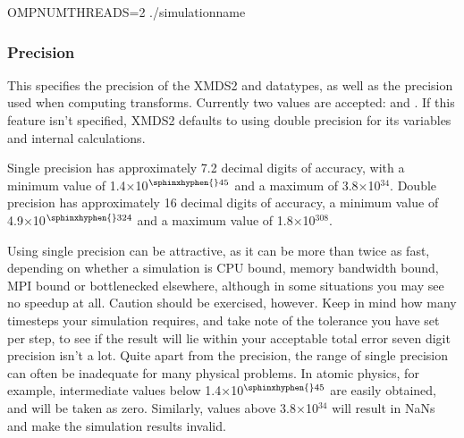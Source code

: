 \documentclass[letterpaper,10pt,english]{sphinxmanual}
\begin{document}
\begin{sphinxVerbatim}[commandchars=\\\{\}]
OMP\PYGZus{}NUM\PYGZus{}THREADS=2 ./simulation\PYGZus{}name
\end{sphinxVerbatim}

\ignorespaces 

\subsubsection{Precision}
\label{\detokenize{reference_elements:precision}}\label{\detokenize{reference_elements:index-21}}\label{\detokenize{reference_elements:id6}}
\sphinxAtStartPar
This specifies the precision of the XMDS2  and  datatypes, as well as the precision used when computing transforms. Currently two values are accepted:  and . If this feature isn’t specified, XMDS2 defaults to using double precision for its variables and internal calculations.

\sphinxAtStartPar
Single precision has approximately 7.2 decimal digits of accuracy, with a minimum value of 1.4×10$^{\text{\sphinxhyphen{}45}}$ and a maximum of 3.8×10$^{\text{34}}$. Double precision has approximately 16 decimal digits of accuracy, a minimum value of 4.9×10$^{\text{\sphinxhyphen{}324}}$ and a maximum value of 1.8×10$^{\text{308}}$.

\sphinxAtStartPar
Using single precision can be attractive, as it can be more than twice as fast, depending on whether a simulation is CPU bound, memory bandwidth bound, MPI bound or bottlenecked elsewhere, although in some situations you may see no speed\sphinxhyphen{}up at all. Caution should be exercised, however. Keep in mind how many timesteps your simulation requires, and take note of the tolerance you have set per step, to see if the result will lie within your acceptable total error \sphinxhyphen{} seven digit precision isn’t a lot. Quite apart from the precision, the range of single precision can often be inadequate for many physical problems. In atomic physics, for example, intermediate values below 1.4×10$^{\text{\sphinxhyphen{}45}}$ are easily obtained, and will be taken as zero. Similarly, values above 3.8×10$^{\text{34}}$ will result in NaNs and make the simulation results invalid.
\end{document}
